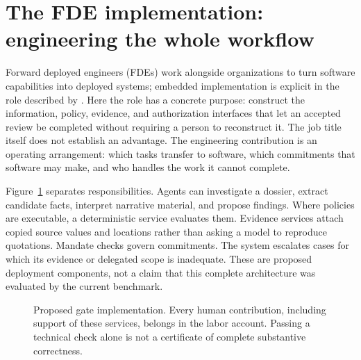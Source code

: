 \section{The FDE implementation: engineering the whole workflow}
\label{sec:fde}

Forward deployed engineers (FDEs) work alongside organizations to turn software capabilities
into deployed systems; embedded implementation is explicit in the role described by
\citet{palantirfde2026}. Here the role has a concrete purpose: construct the information,
policy, evidence, and authorization interfaces that let an accepted review be completed without
requiring a person to reconstruct it. The job title itself does not establish an advantage.
The engineering contribution is an operating arrangement: which tasks transfer to software,
which commitments that software may make, and who handles the work it cannot complete.

Figure~\ref{fig:implementation} separates responsibilities. Agents can investigate a dossier,
extract candidate facts, interpret narrative material, and propose findings. Where policies
are executable, a deterministic service evaluates them. Evidence services attach copied source
values and locations rather than asking a model to reproduce quotations. Mandate checks govern
commitments. The system escalates cases for which its evidence or delegated scope is inadequate.
These are proposed deployment components, not a claim that this complete architecture was
evaluated by the current benchmark.

\begin{figure}[!htb]
\centering
{}
\caption{Proposed gate implementation. Every human contribution, including support of these
services, belongs in the labor account. Passing a technical check alone is not a certificate
of complete substantive correctness.}
\label{fig:implementation}
\end{figure}

